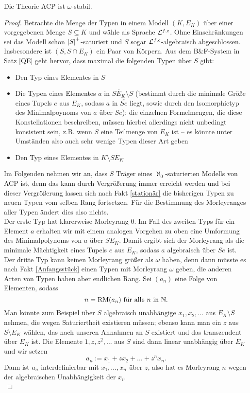     \begin{theorem}
    	Die Theorie ACP ist $\omega$-stabil.
    \end{theorem}
    \begin{proof}
    	Betrachte die Menge der Typen in einem Modell $(K,E_K)$ über einer vorgegebenen Menge $S\subseteq K$ und wähle als Sprache $\mathcal{L}^{f,c}$. Ohne Einschränkungen sei das Modell schon ${\left| S \right|}^+$-saturiert und $S$ sogar $\mathcal{L}^{f,c}$-algebraisch abgeschlossen. Insbesondere ist $(S,S\cap E_K)$ ein Paar von Körpern. Aus dem B\&F-System in Satz \ref{QE} geht hervor, dass maximal die folgenden Typen über $S$ gibt:
    	\begin{itemize}
    		\item Den Typ eines Elementes in $S$
    		\item Die Typen eines Elementes $a$ in $\overline{SE_K}\setminus S$ (bestimmt durch die minimale Größe eines Tupels $e$ aus $E_K$, sodass $a$ in $\overline{Se}$ liegt, sowie durch den Isomorphietyp des Minimalpoynoms von $a$ über $Se$); die einzelnen Formelmengen, die diese Konstellationen beschreiben, müssen hierbei allerdings nicht unbedingt konsistent sein, z.B. wenn $S$ eine Teilmenge von $E_K$ ist \--- es könnte unter Umständen also auch sehr wenige Typen dieser Art geben
    		\item Den Typ eines Elementes in $K\setminus\overline{SE_K}$
    	\end{itemize}
        Im Folgenden nehmen wir an, dass $S$ Träger eines $\aleph_0$-saturierten Modells von ACP ist, denn das kann durch Vergrößerung immer erreicht werden und bei dieser Vergrößerung lassen sich nach Fakt \ref{stationär} die bisherigen Typen zu neuen Typen vom selben Rang fortsetzen. Für die Bestimmung des Morleyranges aller Typen ändert dies also nichts.\\
        Der erste Typ hat klarerweise Morleyrang 0. Im Fall des zweiten Typs für ein Element $a$ erhalten wir mit einem analogen Vorgehen zu oben eine Umformung des Minimalpolynoms von $a$ über $SE_K$. Damit ergibt sich der Morleyrang als die minimale Mächtigkeit eines Tupels $e$ aus $E_K$, sodass $a$ algebraisch über $Se$ ist.\newpage
        Der dritte Typ kann keinen Morleyrang größer als $\omega$ haben, denn dann müsste es nach Fakt \ref{Anfangsstück} einen Typen mit Morleyrang $\omega$ geben, die anderen Arten von Typen haben aber endlichen Rang. Sei $(a_n)$ eine Folge von Elementen, sodass $$n=\operatorname{RM}(a_n)\text{ für alle }n\text{ in }\mathbb{N}.$$ Man könnte zum Beispiel über $S$ algebraisch unabhängige $x_1,x_2,\dots$ aus $E_K\setminus S$ nehmen, die wegen Saturiertheit existieren müssen; ebenso kann man ein $z$ aus $S\setminus E_K$ wählen, das nach unseren Annahmen an $S$ existiert und das transzendent über $E_K$ ist. Die Elemente $1,z,z^2,\dots$ aus $S$ sind dann linear unabhängig über $E_K$ und wir setzen $$a_n:=x_1+zx_2+\dots+z^nx_n.$$ Dann ist $a_n$ interdefinierbar mit $x_1,\dots,x_n$ über $z$, also hat es Morleyrang $n$ wegen der algebraischen Unabhängigkeit der $x_i$.\\

\end{proof}
